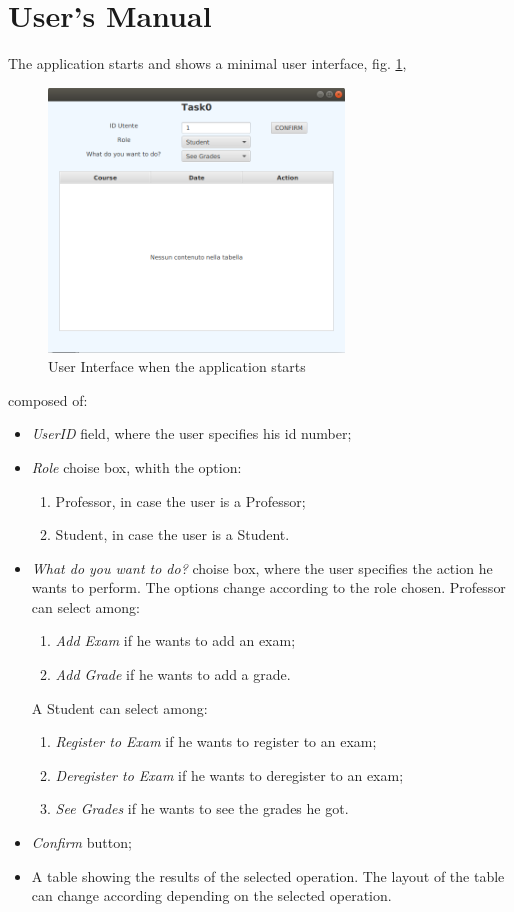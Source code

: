 \documentclass{report}
\begin{document}
\chapter*{User's Manual}
The application starts and shows a minimal user interface, fig. \ref{fig:UIStart},
\begin{figure}[h!]
	\centering
	\includegraphics[width=0.7\textwidth]{UIStart.png}
	\caption{User Interface when the application starts}
	\label{fig:UIStart}
\end{figure}
composed of:
\begin{itemize}
	\item \textit{UserID} field, where the user specifies his id number;
	\item \textit{Role} choise box, whith the option:
	\begin{enumerate}
		\item Professor, in case the user is a Professor;
		\item Student, in case the user is a Student.
	\end{enumerate} 
	\item \textit{What do you want to do?} choise box, where the user specifies the action he wants to perform. The options change according to the role chosen.
Professor can select among:
	\begin{enumerate}
		\item \textit{Add Exam} if he wants to add an exam;
		\item \textit{Add Grade} if he wants to add a grade.
	\end{enumerate}
	A Student can select among:
	\begin{enumerate}
		\item \textit{Register to Exam} if he wants to register to an exam;
		\item \textit{Deregister to Exam} if he wants to deregister to an exam;
		\item \textit{See Grades} if he wants to see the grades he got.
	\end{enumerate}
	\item \textit{Confirm} button;
	\item A table showing the results of the selected operation. The layout of the table can change according depending on the selected operation.
\end{itemize}
\end{document}
